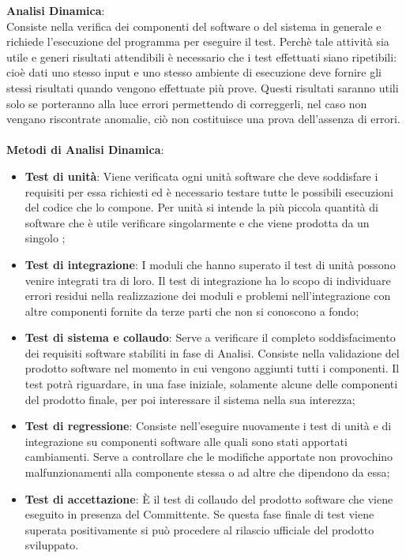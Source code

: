 \textbf{Analisi Dinamica}:\medskip \\
Consiste nella verifica dei componenti del software o del sistema in generale e richiede l'esecuzione del programma per eseguire il test.
Perchè tale attività sia utile e generi risultati attendibili è necessario che i test effettuati siano ripetibili: cioè dati uno stesso input e uno stesso ambiente di esecuzione deve fornire gli stessi risultati quando vengono effettuate più prove. Questi risultati saranno utili solo se porteranno alla luce errori permettendo di correggerli, nel caso non vengano riscontrate anomalie, ciò non costituisce una prova dell'assenza di errori.
\\ \\ \textbf{Metodi di Analisi Dinamica}:
\begin{itemize}
	\item \textbf{Test di unità}:
	Viene verificata ogni unità software che deve soddisfare i requisiti per essa richiesti ed è necessario testare tutte le possibili esecuzioni del codice che lo compone. Per unità si intende la più piccola quantità di software che è utile verificare singolarmente e che viene prodotta da un singolo \ruoloProgrammatore;
	\item \textbf{Test di integrazione}:
	I moduli che hanno superato il test di unità possono
	venire integrati tra di loro. Il test di integrazione ha lo scopo di individuare errori residui nella realizzazione dei moduli e problemi nell'integrazione con altre componenti fornite da terze parti che non si conoscono a fondo;
	\item \textbf{Test di sistema e collaudo}:
	Serve a verificare il completo soddisfacimento dei requisiti software stabiliti in fase di Analisi. Consiste nella validazione del prodotto software nel momento in cui vengono aggiunti tutti i componenti. Il test potrà riguardare, in una fase iniziale, solamente alcune delle componenti del prodotto finale, per poi interessare il sistema nella sua interezza;
	\item \textbf{Test di regressione}:
	Consiste nell'eseguire nuovamente i test di unità e di integrazione su componenti software alle quali sono stati apportati cambiamenti. Serve a  controllare che le modifiche apportate non provochino malfunzionamenti alla componente stessa o ad altre che dipendono da essa;
	\item \textbf{Test di accettazione}:
	È il test di collaudo del prodotto software che viene eseguito in presenza del Committente. Se questa fase finale di test viene superata positivamente si può procedere al rilascio ufficiale del prodotto sviluppato.
\end{itemize}
\newpage
